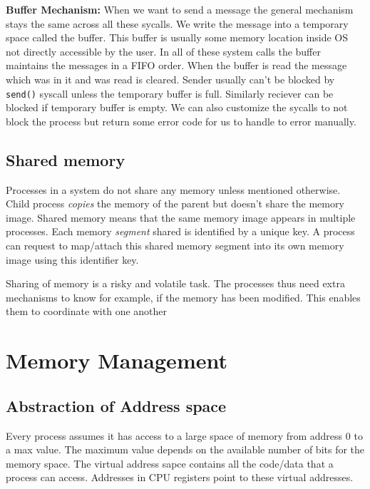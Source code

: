 \documentclass[12pt]{article}
\newcommand{\tbox}[1]{\noindent\fbox{\parbox{\textwidth}{#1}}}
\begin{document}
\textbf{Buffer Mechanism:}  
When we want to send a message the general mechanism stays the same across all these sycalls. We write the message into a temporary space called the buffer. This buffer is usually some memory location
inside OS not directly accessible by the user.
In all of these system calls the buffer maintains the messages in a FIFO order. When the buffer is read the message which was in it and was read is cleared. Sender 
usually can't be blocked by \texttt{send()} syscall unless the temporary buffer is full. Similarly reciever can be blocked if temporary buffer is empty. We can also customize the sycalls to not block the process
but return some error code for us to handle to error manually.

\subsection{Shared memory}
Processes in a system do not share any memory unless mentioned otherwise. Child process \textit{copies} the memory of the parent but doesn't share the memory image.
Shared memory means that the same memory image appears in multiple processes. Each memory \textit{segment} shared is identified by a unique key. A process can request to map/attach this shared 
memory segment into its own memory image using this identifier key. 

Sharing of memory is a risky and volatile task. The processes thus need extra mechanisms to know for example, if the memory has been modified. This enables them to coordinate with one another

\newpage
\noindent\tbox{
    \begin{center}
    \textbf{\Huge Lecture 12}
    \end{center}
}
\section{Memory Management}
\subsection*{Abstraction of Address space}
Every process assumes it has access to a large space of memory from address 0 to a max value. The maximum value depends on the available number of bits for the memory space.
The virtual address sapce contains all the code/data that a process can access. Addresses in CPU registers point to these virtual addresses.
\end{document}
